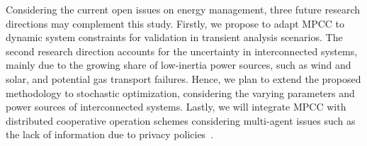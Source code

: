 Considering the current open issues on energy management, three future research directions may complement this study. Firstly, we propose to adapt MPCC to dynamic system constraints for validation in transient analysis scenarios. The second research direction accounts for the uncertainty in interconnected systems, mainly due to the growing share of low-inertia power sources, such as wind and solar, and potential gas transport failures. Hence, we plan to extend the proposed methodology to stochastic optimization, considering the varying parameters and power sources of interconnected systems. Lastly, we will integrate MPCC with distributed cooperative operation schemes considering multi-agent issues such as the lack of information due to privacy policies~\citep{DING2024123275}.
